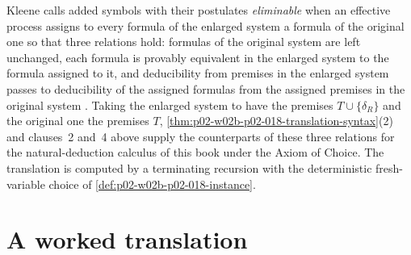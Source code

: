 Kleene calls added symbols with their postulates \emph{eliminable} when an
effective process assigns to every formula of the enlarged system a formula
of the original one so that three relations hold: formulas of the original
system are left unchanged, each formula is provably equivalent in the
enlarged system to the formula assigned to it, and deducibility from
premises in the enlarged system passes to deducibility of the assigned
formulas from the assigned premises in the original system
\cite[\S\,74, p.~405]{Kleene1952}.  Taking the enlarged system to have the
premises \(T\cup\{\delta_R\}\) and the original one the premises \(T\),
\cref{thm:p02-w02b-p02-018-translation-syntax}(2) and clauses~2 and~4
above supply the counterparts of these three relations for the
natural-deduction calculus of this book under the Axiom of Choice.  The
translation is computed by a terminating recursion with the
deterministic fresh-variable choice of \cref{def:p02-w02b-p02-018-instance}.

\section{A worked translation}
\label{sec:p02-w02b-p02-018-example}

